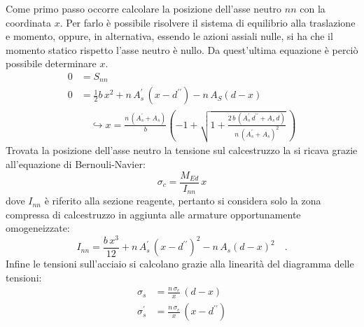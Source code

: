 Come primo passo occorre calcolare la posizione dell'asse neutro $nn$ con la coordinata $x$. 
Per farlo è possibile risolvere il sistema di equilibrio alla traslazione e momento, oppure, in alternativa, essendo le azioni assiali nulle, si ha che il momento statico rispetto l'asse neutro è nullo. 
Da quest'ultima equazione è perciò possibile determinare $x$.
\begin{align}
    0 &= S_{nn}  \\
    0 &= \frac{1}{2} b\,x^2 + n\,A_s^\prime\,(x - d^{\prime\prime}) - n\,A_S(d-x) \\
    &\quad\hookrightarrow x = \frac{n\,(A_s^\prime + A_s)}{b} \left( -1 + \sqrt{1 + \frac{2\,b\,(A_s^\prime \, d^{\prime\prime} + A_s\,d)}{n\,(A_s^\prime + A_s)^2}} \, \right)
\end{align}
Trovata la posizione dell'asse neutro la tensione sul calcestruzzo la si ricava grazie all'equazione di Bernouli-Navier:
\begin{equation}
    \sigma_c = \frac{M_{Ed}}{I_{nn}} \, x
\end{equation}
dove $I_{nn}$ è riferito alla sezione reagente, pertanto si considera solo la zona compressa di calcestruzzo in aggiunta alle armature opportunamente omogeneizzate:
\begin{equation}
    I_{nn} = \frac{b\, x^3}{12} + n\,A_s^\prime\,(x - d^{\prime\prime})^2 - n\,A_s(d-x)^2 \quad.
\end{equation}
Infine le tensioni sull'acciaio si calcolano grazie alla linearità del diagramma delle tensioni:
\begin{align}
    \sigma_s &= \frac{n\,\sigma_c}{x} \, (d-x) \\
    \sigma_s^\prime &= \frac{n\,\sigma_c}{x} \,(x - d^{\prime\prime})
\end{align}

